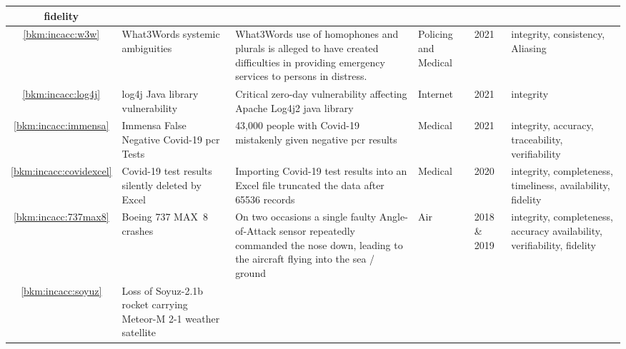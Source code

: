 \begin{longtable}{|C{}|L{}|L{}|L{}|L{}|L{}|}
  \gls{fidelity}\\
  \hline
  \ref{bkm:incacc:w3w} & What3Words systemic ambiguities &
  What3Words use of homophones and plurals is alleged to have created difficulties in providing emergency services
  to persons in distress.
  &
  Policing and Medical & 2021 & \Gls{integrity},
  \gls{consistency},
  Aliasing\\
  \hline
        \ref{bkm:incacc:log4j} & log4j Java library vulnerability &
        Critical zero-day vulnerability affecting Apache Log4j2 java library &
        Internet & 2021 & \Gls{integrity}\\
        \hline
        \ref{bkm:incacc:immensa} & Immensa False Negative Covid-19 \gls{pcr} Tests &
        43,000 people with Covid-19 mistakenly given negative \gls{pcr} results &
        Medical & 2021 & \Gls{integrity}, \gls{accuracy}, \gls{traceability}, \gls{verifiability}\\
        \hline
        \ref{bkm:incacc:covidexcel} & Covid-19 test results silently deleted by Excel &
        Importing Covid-19 test results into an Excel file truncated the data after 65536 records &
        Medical & 2020 & \Gls{integrity}, \gls{completeness}, \gls{timeliness}, \gls{availability}, \gls{fidelity}\\
        \hline
	\ref{bkm:incacc:737max8} & Boeing 737 MAX~8 crashes &
	On two occasions a single faulty Angle-of-Attack sensor repeatedly commanded the nose down,
        leading to the aircraft flying into the sea / ground
	& Air & 2018 \& 2019 & \Gls{integrity}, \gls{completeness}, \gls{accuracy}\vspace{1ex} \gls{availability}, \gls{verifiability}, \gls{fidelity}\\ 
	\hline
        \ref{bkm:incacc:soyuz} & Loss of Soyuz-2.1b rocket carrying Meteor-M 2-1 weather satellite &

\end{longtable}
